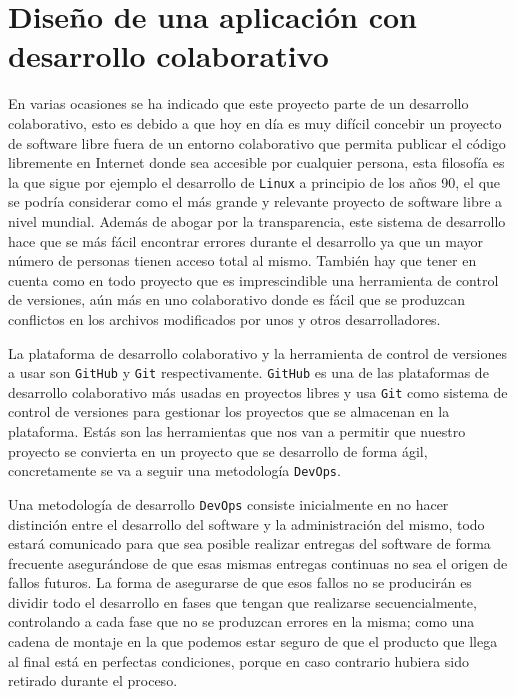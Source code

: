 \newpage
\section{Diseño de una aplicación con desarrollo colaborativo}

En varias ocasiones se ha indicado que este proyecto parte de un desarrollo colaborativo, esto es debido a que hoy en día es muy difícil concebir un proyecto de software libre fuera de un entorno colaborativo que permita publicar el código libremente en Internet donde sea accesible por cualquier persona, esta filosofía es la que sigue por ejemplo el desarrollo de {\tt Linux} a principio de los años 90, el que se podría considerar como el más grande y relevante proyecto de software libre a nivel mundial. Además de abogar por la transparencia, este sistema de desarrollo hace que se más fácil encontrar errores durante el desarrollo ya que un mayor número de personas tienen acceso total al mismo. También hay que tener en cuenta como en todo proyecto que es imprescindible una herramienta de control de versiones, aún más en uno colaborativo donde es fácil que se produzcan conflictos en los archivos modificados por unos y otros desarrolladores.

\bigskip
La plataforma de desarrollo colaborativo y la herramienta de control de versiones a usar son {\tt GitHub} y {\tt Git} respectivamente. {\tt GitHub} es una de las plataformas de desarrollo colaborativo más usadas en proyectos libres y usa {\tt Git} como sistema de control de versiones para gestionar los proyectos que se almacenan en la plataforma. Estás son las herramientas que nos van a permitir que nuestro proyecto se convierta en un proyecto que se desarrollo de forma ágil,  concretamente se va a seguir una metodología {\tt DevOps}.

\bigskip
Una metodología de desarrollo {\tt DevOps} consiste inicialmente en no hacer distinción entre el desarrollo del software y la administración del mismo, todo estará comunicado para que sea posible realizar entregas del software de forma frecuente asegurándose de que esas mismas entregas continuas no sea el origen de fallos futuros. La forma de asegurarse de que esos fallos no se producirán es dividir todo el desarrollo en fases que tengan que realizarse secuencialmente, controlando a cada fase que no se produzcan errores en la misma; como una cadena de montaje en la que podemos estar seguro de que el producto que llega al final está en perfectas condiciones, porque en caso contrario hubiera sido retirado durante el proceso.

